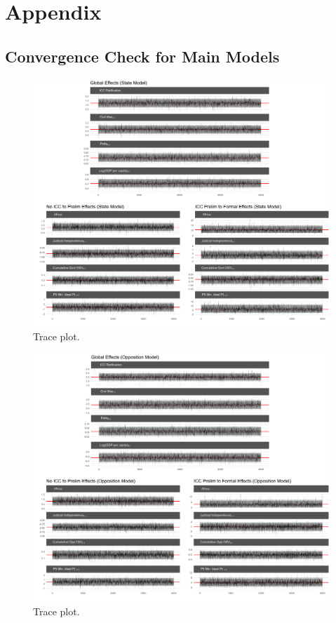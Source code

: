 \renewcommand{\thefigure}{A\arabic{figure}}
\setcounter{figure}{0}
\renewcommand{\thetable}{A.\arabic{table}}
\setcounter{table}{0}
\renewcommand{\thesection}{A.\arabic{section}}
\setcounter{section}{0}

\section*{Appendix}

\subsection*{Convergence Check for Main Models}

\begin{figure}
    \centering
    \includegraphics[width=1\textwidth]{stateCoefTrace.pdf}
    \caption{Trace plot.}
    \label{fig:stateTrace}
\end{figure}

\begin{figure}
    \centering
    \includegraphics[width=1\textwidth]{rebelCoefTrace.pdf}
    \caption{Trace plot.}
    \label{fig:oppTrace}
\end{figure}

